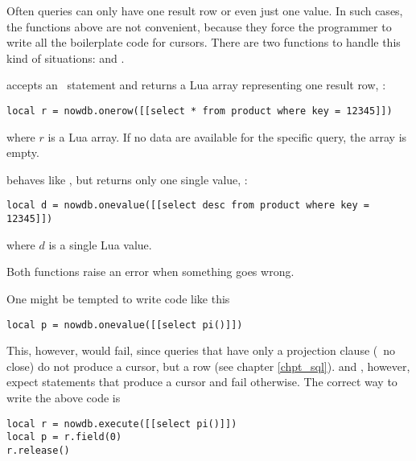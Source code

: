 Often queries can only have one result row or even
just one value. In such cases, the functions above
are not convenient, because they force the programmer
to write all the boilerplate code for cursors.
There are two functions to handle this kind of
situations:  and
.

 accepts an \sql\ statement
and returns a Lua array representing one
result row, \eg:

\begin{lua}
\begin{lstlisting}
local r = nowdb.onerow([[select * from product where key = 12345]])
\end{lstlisting}
\end{lua}

where $r$ is a Lua array.
If no data are available for the specific query,
the array is empty.

 behaves like ,
but returns only one single value, \eg:

\begin{lua}
\begin{lstlisting}
local d = nowdb.onevalue([[select desc from product where key = 12345]])
\end{lstlisting}
\end{lua}

where $d$ is a single Lua value.

Both functions raise an error when something goes wrong.

One might be tempted to write code like this

\begin{lua}
\begin{lstlisting}
local p = nowdb.onevalue([[select pi()]])
\end{lstlisting}
\end{lua}

This, however, would fail, since queries
that have only a projection clause (\ie\ no  close)
do not produce a cursor, but a row (see chapter \ref{chpt_sql}).
 and , however, expect
statements that produce a cursor and fail otherwise.
The correct way to write the above code is

\begin{lua}
\begin{lstlisting}
local r = nowdb.execute([[select pi()]])
local p = r.field(0)
r.release()
\end{lstlisting}
\end{lua}

